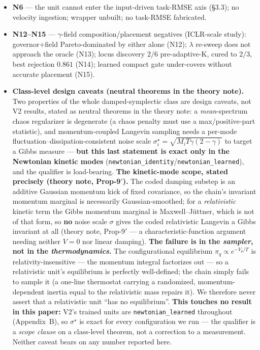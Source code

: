 \documentclass[10pt]{article}
\begin{document}
\begin{itemize}
\item \textbf{N6} --- the unit cannot enter the input-driven task-RMSE axis (\S3.3); no velocity ingestion; wrapper unbuilt; no task-RMSE fabricated.
\item \textbf{N12--N15} --- $\gamma$-field composition/placement negatives (ICLR-scale study): governor+field Pareto-dominated by either alone (N12); $\lambda$ re-sweep does not approach the oracle (N13); locus discovery $2/6$ pre-adaptive-K, cured to $2/3$, best rejection $0.861$ (N14); learned compact gate under-covers without accurate placement (N15).
\item \textbf{Class-level design caveats (neutral theorems in the theory note).} Two properties of the whole damped-symplectic class are design caveats, not V2 results, stated as neutral theorems in the theory note: a \emph{mean}-spectrum chaos regularizer is degenerate (a chaos penalty must use a max/positive-part statistic), and momentum-coupled Langevin sampling needs a per-mode fluctuation--dissipation-consistent noise scale $\sigma^\star_i=\sqrt{M_iT\gamma(2-\gamma)}$ to target a Gibbs measure --- \textbf{but this last statement is exact only in the Newtonian kinetic modes} (\texttt{newtonian\_identity}/\texttt{newtonian\_learned}), and the qualifier is load-bearing. \textbf{The kinetic-mode scope, stated precisely (theory note, Prop-9$'$).} The coded damping substep is an additive Gaussian momentum kick of fixed covariance, so the chain's invariant momentum marginal is necessarily Gaussian-smoothed; for a \emph{relativistic} kinetic term the Gibbs momentum marginal is Maxwell--J\"uttner, which is not of that form, so \textbf{no} noise scale $\sigma$ gives the coded relativistic Langevin a Gibbs invariant at all (theory note, Prop-9$'$ --- a characteristic-function argument needing neither $V=0$ nor linear damping). \textbf{The failure is in the \emph{sampler}, not in the \emph{thermodynamics}.} The configurational equilibrium $\pi_q\propto e^{-V_\theta/T}$ is relativity-insensitive --- the momentum integral factorizes out --- so a relativistic unit's equilibrium is perfectly well-defined; the chain simply fails to sample it (a one-line thermostat carrying a randomized, momentum-dependent inertia equal to the relativistic mass repairs it). We therefore never assert that a relativistic unit ``has no equilibrium''. \textbf{This touches no result in this paper:} V2's trained units are \texttt{newtonian\_learned} throughout (Appendix~B), so $\sigma^\star$ is exact for every configuration we run --- the qualifier is a \emph{scope clause} on a class-level theorem, not a correction to a measurement. Neither caveat bears on any number reported here.

\end{itemize}
\end{document}
